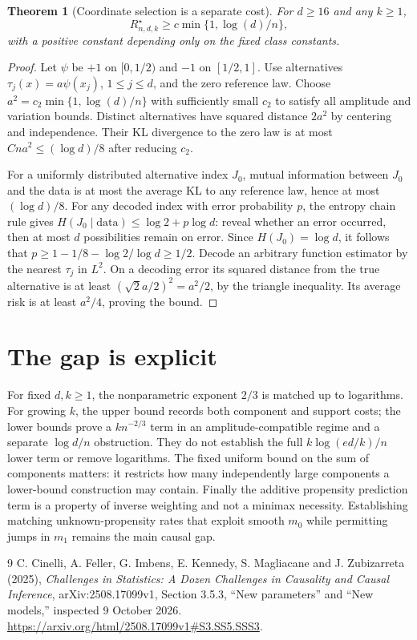 \documentclass[11pt]{article}
\newtheorem{theorem}{Theorem}
\theoremstyle{remark}
\begin{document}
\begin{theorem}[Coordinate selection is a separate cost]\label{selection}
For $d\geq16$ and any $k\geq1$,
\[
               R_{n,d,k}^\star\geq c\min\{1,\log(d)/n\},
\]
with a positive constant depending only on the fixed class constants.
\end{theorem}
\begin{proof}
Let $\psi$ be $+1$ on $[0,1/2)$ and $-1$ on $[1/2,1]$.
Use alternatives $\tau_j(x)=a\psi(x_j)$, $1\leq j\leq d$, and the zero reference law. Choose
$a^2=c_2\min\{1,\log(d)/n\}$ with sufficiently small $c_2$ to satisfy all amplitude and variation bounds. Distinct alternatives have squared distance $2a^2$ by centering and independence. Their KL divergence to the zero law is at most $Cna^2\leq(\log d)/8$ after reducing $c_2$.

For a uniformly distributed alternative index $J_0$, mutual information between $J_0$ and the data is at most the average KL to any reference law, hence at most $(\log d)/8$. For any decoded index with error probability $p$, the entropy chain rule gives
$H(J_0\mid\text{data})\leq\log2+p\log d$: reveal whether an error occurred, then at most $d$ possibilities remain on error. Since $H(J_0)=\log d$, it follows that
$p\geq1-1/8-\log2/\log d\geq1/2$.
Decode an arbitrary function estimator by the nearest $\tau_j$ in $L^2$. On a decoding error its squared distance from the true alternative is at least $(\sqrt{2}a/2)^2=a^2/2$, by the triangle inequality. Its average risk is at least $a^2/4$, proving the bound.
\end{proof}

\section{The gap is explicit}
For fixed $d,k\geq1$, the nonparametric exponent $2/3$ is matched up to logarithms. For growing $k$, the upper bound records both component and support costs; the lower bounds prove a $kn^{-2/3}$ term in an amplitude-compatible regime and a separate $\log d/n$ obstruction. They do not establish the full $k\log(ed/k)/n$ lower term or remove logarithms. The fixed uniform bound on the sum of components matters: it restricts how many independently large components a lower-bound construction may contain. Finally the additive propensity prediction term is a property of inverse weighting and not a minimax necessity. Establishing matching unknown-propensity rates that exploit smooth $m_0$ while permitting jumps in $m_1$ remains the main causal gap.

\begin{thebibliography}{9}
 C. Cinelli, A. Feller, G. Imbens, E. Kennedy, S. Magliacane and J. Zubizarreta (2025), \emph{Challenges in Statistics: A Dozen Challenges in Causality and Causal Inference}, arXiv:2508.17099v1, Section 3.5.3, ``New parameters'' and ``New models,'' inspected 9 October 2026. \url{https://arxiv.org/html/2508.17099v1#S3.SS5.SSS3}.
\end{thebibliography}
\end{document}
